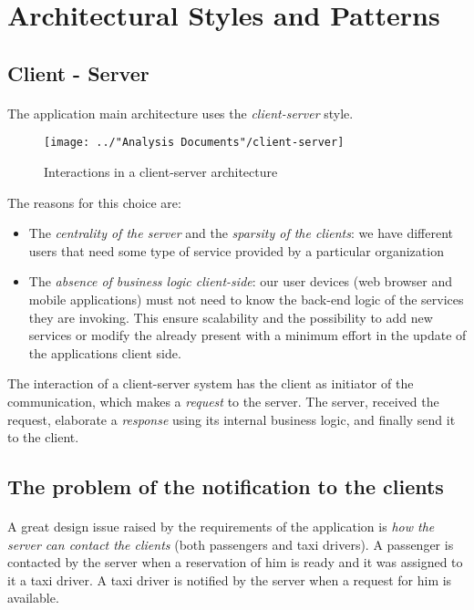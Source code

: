 \section{Architectural Styles and Patterns}

\subsection{Client - Server}
\paragraph{}The application main architecture uses the \textit{client-server} style.
\begin{figure}[H]
	\centering
	\texttt{[image: ../"Analysis Documents"/client-server]}
	\caption{Interactions in a client-server architecture}
\end{figure}
The reasons for this choice are:
\begin{itemize}
	\item The \textit{centrality of the server} and the \textit{sparsity of the clients}: we have different users that need some type of service provided by a particular organization
	\item The \textit{absence of business logic client-side}: our user devices (web browser and mobile applications) must not need to know the back-end logic of the services they are invoking. This ensure scalability and the possibility to add new services or modify the already present with a minimum effort in the update of the applications client side.
\end{itemize}
The interaction of a client-server system has the client as initiator of the communication, which makes a \textit{request} to the server. The server, received the request, elaborate a \textit{response} using its internal business logic, and finally send it to the client.
\subsection{The problem of the notification to the clients}
\paragraph{}A great design issue raised by the requirements of the application is \textit{how the server can contact the clients} (both passengers and taxi drivers). A passenger is contacted by the server when a reservation of him is ready and it was assigned to it a taxi driver. A taxi driver is notified by the server when a request for him is available.
